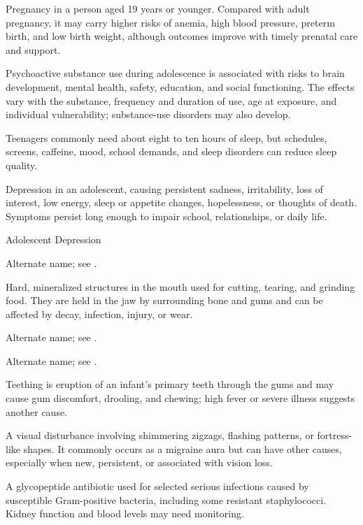  Pregnancy in a person aged 19 years or younger. Compared with adult pregnancy, it may carry higher risks of anemia, high blood pressure, preterm birth, and low birth weight, although outcomes improve with timely prenatal care and support.

 Psychoactive substance use during adolescence is associated with risks to brain development, mental health, safety, education, and social functioning. The effects vary with the substance, frequency and duration of use, age at exposure, and individual vulnerability; substance-use disorders may also develop.

 Teenagers commonly need about eight to ten hours of sleep, but schedules, screens, caffeine, mood, school demands, and sleep disorders can reduce sleep quality.

 Depression in an adolescent, causing persistent sadness, irritability, loss of interest, low energy, sleep or appetite changes, hopelessness, or thoughts of death. Symptoms persist long enough to impair school, relationships, or daily life.

\synonyms
Adolescent Depression

 Alternate name; see .

 Hard, mineralized structures in the mouth used for cutting, tearing, and grinding food. They are held in the jaw by surrounding bone and gums and can be affected by decay, infection, injury, or wear.

 Alternate name; see .

 Alternate name; see .

 Teething is eruption of an infant’s primary teeth through the gums and may cause gum discomfort, drooling, and chewing; high fever or severe illness suggests another cause.

 A visual disturbance involving shimmering zigzags, flashing patterns, or fortress-like shapes. It commonly occurs as a migraine aura but can have other causes, especially when new, persistent, or associated with vision loss.

 A glycopeptide antibiotic used for selected serious infections caused by susceptible Gram-positive bacteria, including some resistant staphylococci. Kidney function and blood levels may need monitoring.

